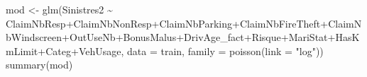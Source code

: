 \documentclass[
]{article}
\newenvironment{Shaded}{\begin{snugshade}}{\end{snugshade}}
\newcommand{\AttributeTok}[1]{\textcolor[rgb]{0.77,0.63,0.00}{#1}}
\newcommand{\FunctionTok}[1]{\textcolor[rgb]{0.00,0.00,0.00}{#1}}
\newcommand{\NormalTok}[1]{#1}
\newcommand{\OtherTok}[1]{\textcolor[rgb]{0.56,0.35,0.01}{#1}}
\newcommand{\SpecialCharTok}[1]{\textcolor[rgb]{0.00,0.00,0.00}{#1}}
\newcommand{\StringTok}[1]{\textcolor[rgb]{0.31,0.60,0.02}{#1}}
\begin{document}
\begin{Shaded}
\begin{Highlighting}[]
\NormalTok{mod }\OtherTok{\textless{}{-}} \FunctionTok{glm}\NormalTok{(Sinistres2 }\SpecialCharTok{\textasciitilde{}}\NormalTok{ ClaimNbResp}\SpecialCharTok{+}\NormalTok{ClaimNbNonResp}\SpecialCharTok{+}\NormalTok{ClaimNbParking}\SpecialCharTok{+}\NormalTok{ClaimNbFireTheft}\SpecialCharTok{+}\NormalTok{ClaimNbWindscreen}\SpecialCharTok{+}\NormalTok{OutUseNb}\SpecialCharTok{+}\NormalTok{BonusMalus}\SpecialCharTok{+}\NormalTok{DrivAge\_fact}\SpecialCharTok{+}\NormalTok{Risque}\SpecialCharTok{+}\NormalTok{MariStat}\SpecialCharTok{+}\NormalTok{HasKmLimit}\SpecialCharTok{+}\NormalTok{Categ}\SpecialCharTok{+}\NormalTok{VehUsage, }\AttributeTok{data =}\NormalTok{ train, }\AttributeTok{family =} \FunctionTok{poisson}\NormalTok{(}\AttributeTok{link =} \StringTok{"log"}\NormalTok{))}
\FunctionTok{summary}\NormalTok{(mod)}
\end{Highlighting}
\end{Shaded}
\end{document}

